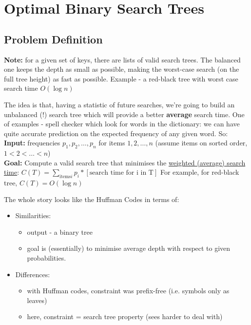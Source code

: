\documentclass{scrartcl}
\begin{document}
\section{Optimal Binary Search Trees}
\label{sec:12-1}
\subsection{Problem Definition}
\label{sec:12-1-1} {\bf Note: } for a given set of keys, there are lists of
valid search trees. The balanced one keeps the depth as small as possible,
making the worst-case search (on the full tree height) as fast as possible.
Example - a red-black tree with worst case search time $O(\log n)$

The idea is that, having a statistic of future searches, we're going to build an
unbalanced (!) search tree which will provide a better {\bf average } search
time. One of examples - spell checker which look for words in the dictionary: we
can have quite accurate prediction on the expected frequency of any given word.
So:\\
{\bf Input: } frequencies $p_1, p_2, \dots, p_n$ for items $1, 2, \dots, n$
(assume items on sorted order, $1 < 2 < \dots < n$)\\
{\bf Goal: } Compute a valid search tree that minimises the \underline{weighted
  (average) search time}: $C(T) = \sum\limits_{\text{items} i} p_i *
[\text{search time for i in T}]$ For example, for red-black tree, $C(T) = O(\log
n)$

The whole story looks like the Huffman Codes in terms of:
\begin{itemize}
\item Similarities:
  \begin{itemize}
  \item output - a binary tree
  \item goal is (essentially) to minimise average depth with respect to given
    probabilities.
  \end{itemize}
\item Differences:
  \begin{itemize}
  \item with Huffman codes, constraint was prefix-free (i.e. symbols only as
    leaves)
  \item here, constraint = search tree property (sees harder to deal with)
  \end{itemize}
\end{itemize}

\end{document}
